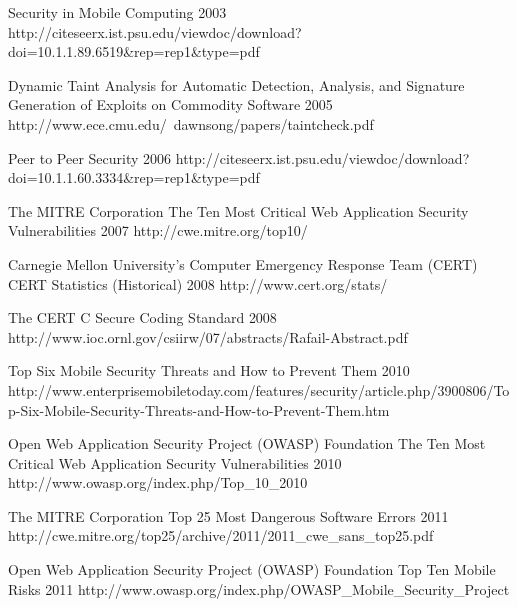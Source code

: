 \begin{thebibliography}{9}
		{
			\BibAnd
			\BibAnd
			\BibAnd
			}
		{Security in Mobile Computing}	
		{2003}	
		{http://citeseerx.ist.psu.edu/viewdoc/download?doi=10.1.1.89.6519\&rep=rep1\&type=pdf}

		{
			\BibAnd
			}
		{Dynamic Taint Analysis for Automatic Detection, Analysis, and Signature Generation of Exploits on Commodity Software}	
		{2005}	
		{http://www.ece.cmu.edu/~dawnsong/papers/taintcheck.pdf}
	
		{}
		{Peer to Peer Security}	
		{2006}
		{http://citeseerx.ist.psu.edu/viewdoc/download?doi=10.1.1.60.3334\&rep=rep1\&type=pdf}

		{The MITRE Corporation}
		{The Ten Most Critical Web Application Security Vulnerabilities}
		{2007}
		{http://cwe.mitre.org/top10/}

		{Carnegie Mellon University's Computer Emergency Response Team (CERT)}
		{CERT Statistics (Historical)}
		{2008}
		{http://www.cert.org/stats/}
				
		{
			\BibAnd
			}
		{The {CERT} {C} Secure Coding Standard}
		{2008}
		{http://www.ioc.ornl.gov/csiirw/07/abstracts/Rafail-Abstract.pdf}
		
		{}
		{Top Six Mobile Security Threats and How to Prevent Them}
		{2010}
		{http://www.enterprisemobiletoday.com/features/security/article.php/3900806/Top-Six-Mobile-Security-Threats-and-How-to-Prevent-Them.htm}
		
		{Open Web Application Security Project (OWASP) Foundation}
		{The Ten Most Critical Web Application Security Vulnerabilities}
		{2010}
		{http://www.owasp.org/index.php/Top_10_2010}
	
		{The MITRE Corporation}
		{Top 25 Most Dangerous Software Errors}
		{2011}
		{http://cwe.mitre.org/top25/archive/2011/2011_cwe_sans_top25.pdf}
		
		{Open Web Application Security Project (OWASP) Foundation}
		{Top Ten Mobile Risks}
		{2011}
		{http://www.owasp.org/index.php/OWASP_Mobile_Security_Project}
		

\end{thebibliography}
